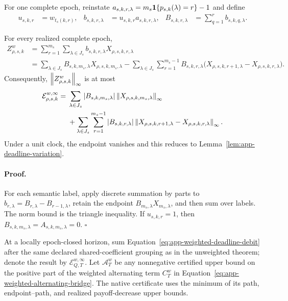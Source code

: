 For one complete epoch, reinstate
$a_{s,k,r,\lambda}=m_s\mathbf 1\{p_{s,k}(\lambda)=r\}-1$ and define
\begin{align}
u_{s,k,r}&=w_{t_s(k,r)},&
b_{s,k,r,\lambda}&=u_{s,k,r}a_{s,k,r,\lambda},&
B_{s,k,r,\lambda}&=\sum_{q=1}^r b_{s,k,q,\lambda}.
\label{eq:app-weighted-component-prefix}
\end{align}

\begin{lemma}
\label{lem:app-weighted-deadline-variation}
For every realized complete epoch,
\begin{align}
Z_{\rho,s,k}^w
&=\sum_{r=1}^{m_s}\sum_{\lambda\in J_s}
b_{s,k,r,\lambda}X_{\rho,s,k,r,\lambda}\nonumber\\
&=\sum_{\lambda\in J_s}B_{s,k,m_s,\lambda}
X_{\rho,s,k,m_s,\lambda}
-\sum_{\lambda\in J_s}\sum_{r=1}^{m_s-1}
B_{s,k,r,\lambda}
\bigl(X_{\rho,s,k,r+1,\lambda}
-X_{\rho,s,k,r,\lambda}\bigr).
\label{eq:app-weighted-deadline-identity}
\end{align}
Consequently, $\left\lVert Z_{\rho,s,k}^w \right\rVert_\infty$ is at most
\begin{align}
\mathcal E_{\rho,s,k}^{w,\infty}
={}&\sum_{\lambda\in J_s}|B_{s,k,m_s,\lambda}|
\left\lVert X_{\rho,s,k,m_s,\lambda} \right\rVert_\infty\nonumber\\
&+\sum_{\lambda\in J_s}\sum_{r=1}^{m_s-1}
|B_{s,k,r,\lambda}|
\left\lVert X_{\rho,s,k,r+1,\lambda}
-X_{\rho,s,k,r,\lambda} \right\rVert_\infty.
\label{eq:app-weighted-deadline-debit}
\end{align}
Under a unit clock, the endpoint vanishes and this reduces to
Lemma~\ref{lem:app-deadline-variation}.
\end{lemma}

\paragraph{Proof.}
For each semantic label, apply discrete summation by parts to
$b_{r,\lambda}=B_{r,\lambda}-B_{r-1,\lambda}$, retain the endpoint
$B_{m_s,\lambda}X_{m_s,\lambda}$, and then sum over labels.  The norm bound
is the triangle inequality.  If $u_{s,k,r}=1$, then
$B_{s,k,m_s,\lambda}=A_{s,k,m_s,\lambda}=0$. \hfill$\square$

At a locally epoch-closed horizon, sum
Equation~\ref{eq:app-weighted-deadline-debit} after the same declared
shared-coefficient grouping as in the unweighted theorem; denote the result
by $\mathcal E_{Q,T}^{w,\infty}$.  Let $\mathcal A_T^w$ be any nonnegative
certified upper bound on the positive part of the weighted alternating term
$C_T^w$ in Equation~\ref{eq:app-weighted-alternating-bridge}.  The native
certificate uses the minimum of its path, endpoint--path, and realized
payoff-decrease upper bounds.

